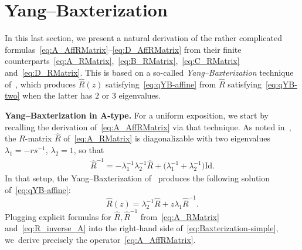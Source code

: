 \documentclass[10pt,a4paper]{amsart}
\numberwithin{equation}{section}
\newcommand{\Id}{\mathrm{Id}}
\begin{document}
\section{Yang--Baxterization}\label{sec:Baxterization}

In this last section, we present a natural derivation of the rather complicated formulas~\eqref{eq:A_AffRMatrix}--\eqref{eq:D_AffRMatrix} from their finite counterparts~\eqref{eq:A_RMatrix},~\eqref{eq:B_RMatrix},~\eqref{eq:C_RMatrix} and~\eqref{eq:D_RMatrix}. This is based on a so-called \emph{Yang--Baxterization} technique of~\cite{GWX}, which produces $\hat{R}(z)$ satisfying~\eqref{eq:qYB-affine} from $\hat{R}$ satisfying~\eqref{eq:qYB-two} when the latter has $2$ or $3$ eigenvalues.


\textbf{Yang--Baxterization in $\boldsymbol{A}$-type.}
For a uniform exposition, we start by recalling the derivation of~\eqref{eq:A_AffRMatrix} via that technique. As noted in~\cite{BW2}, the $R$-matrix $\hat{R}$ of~\eqref{eq:A_RMatrix} is diagonalizable with two eigenvalues $\lambda_1=-rs^{-1}$, $\lambda_2=1$, so that
\begin{gather}
 \hat{R}^{-1}=-\lambda_1^{-1}\lambda_2^{-1}\hat{R}+\bigl(\lambda^{-1}_1+\lambda^{-1}_2\bigr)\Id.\label{eq:R_inverse_A}
\end{gather}
In that setup, the Yang--Baxterization of~\cite[equation~(3.15)]{GWX} produces the following solution of~\eqref{eq:qYB-affine}:
\begin{equation}\label{eq:Baxterization-simple}
 \hat{R}(z)=\lambda_2^{-1}\hat{R} + z\lambda_1 \hat{R}^{-1}.
\end{equation}
Plugging explicit formulas for $\hat{R},\hat{R}^{-1}$ from~\eqref{eq:A_RMatrix} and~\eqref{eq:R_inverse_A} into the right-hand side of~\eqref{eq:Baxterization-simple},
we~derive precisely the operator~\eqref{eq:A_AffRMatrix}.
\end{document}
